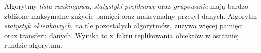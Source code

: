 \documentclass[magisterska]{pracamgr}
\begin{document}
\begin{table}[H]
\centering
\caption{Podsumowanie algorytmu \textit{statystyk okienkowych} na Sparku.}
\label{tab:my-table}
\end{table}

Algorytmy \textit{lista rankingowa}, \textit{statystyki prefiksowe} oraz \textit{grupowanie} mają bardzo zbliżone maksymalne zużycie pamięci oraz maksymalny przesył danych. Algorytm \textit{statystyk okienkowych}, na tle pozostałych algorytmów, zużywa więcej pamięci oraz transferu danych. Wynika to z~faktu replikowania obiektów w ostatniej rundzie algorytmu.
\end{document}

